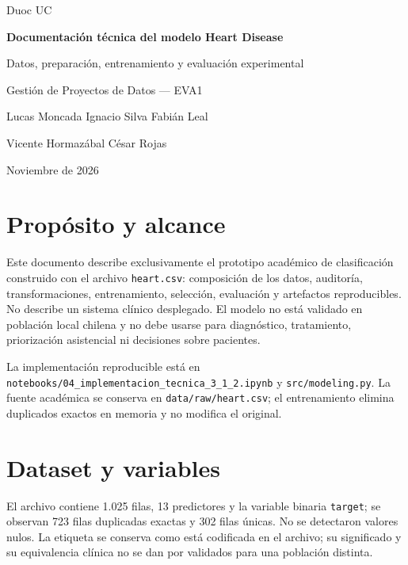 \documentclass[12pt,a4paper]{article}
\begin{document}
\hypersetup{pageanchor=false}
\begin{titlepage}
  \centering
  \vspace*{2.2cm}
  {\Large Duoc UC\par}
  \vspace{2.0cm}
  {\Huge\bfseries Documentación técnica del modelo Heart Disease\par}
  \vspace{0.8cm}
  {\Large Datos, preparación, entrenamiento y evaluación experimental\par}
  \vspace{1.5cm}
  {\large Gestión de Proyectos de Datos --- EVA1\par}
  \vfill
  {\large Lucas Moncada \quad Ignacio Silva \quad Fabián Leal\par}
  {\large Vicente Hormazábal \quad César Rojas\par}
  \vspace{0.8cm}
  {\large Noviembre de 2026\par}
\end{titlepage}
\hypersetup{pageanchor=true}
\tableofcontents
\clearpage
{}

\section{Propósito y alcance}
Este documento describe exclusivamente el prototipo académico de clasificación construido con el archivo \texttt{heart.csv}: composición de los datos, auditoría, transformaciones, entrenamiento, selección, evaluación y artefactos reproducibles. No describe un sistema clínico desplegado. El modelo no está validado en población local chilena y no debe usarse para diagnóstico, tratamiento, priorización asistencial ni decisiones sobre pacientes.

La implementación reproducible está en \texttt{notebooks/04\_implementacion\_tecnica\_3\_1\_2.ipynb} y \texttt{src/modeling.py}. La fuente académica se conserva en \texttt{data/raw/heart.csv}; el entrenamiento elimina duplicados exactos en memoria y no modifica el original.

\section{Dataset y variables}
El archivo contiene 1.025 filas, 13 predictores y la variable binaria \texttt{target}; se observan 723 filas duplicadas exactas y 302 filas únicas. No se detectaron valores nulos. La etiqueta se conserva como está codificada en el archivo; su significado y su equivalencia clínica no se dan por validados para una población distinta.
\end{document}
